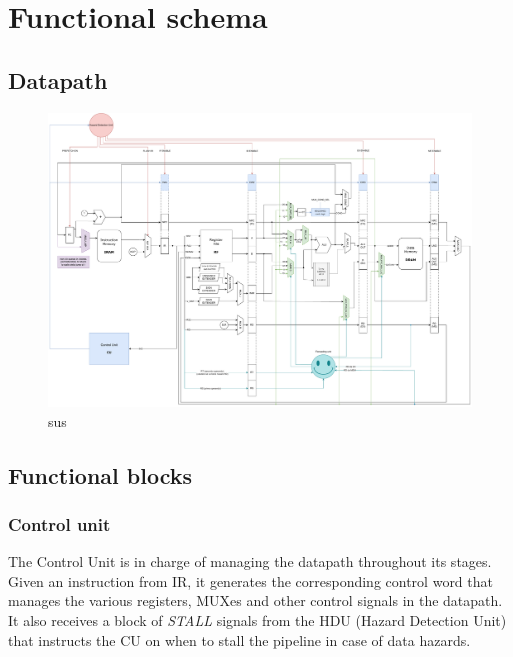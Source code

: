 \chapter{Functional schema}

\section{Datapath}

\begin{figure}[ht]
	\centering
	\includegraphics[width=\textwidth]{chapters/figures/datapath.pdf} 
	\caption{sus}
	\label{fig:datapath}
\end{figure}


\section{Functional blocks}
\subsection{Control unit}
The Control Unit is in charge of managing the datapath throughout its stages. Given an instruction from IR, it generates the corresponding control word that manages the various registers, MUXes and other control signals in the datapath. It also receives a block of \emph{STALL} signals from the HDU (Hazard Detection Unit) that instructs the CU on when to stall the pipeline in case of data hazards. %



